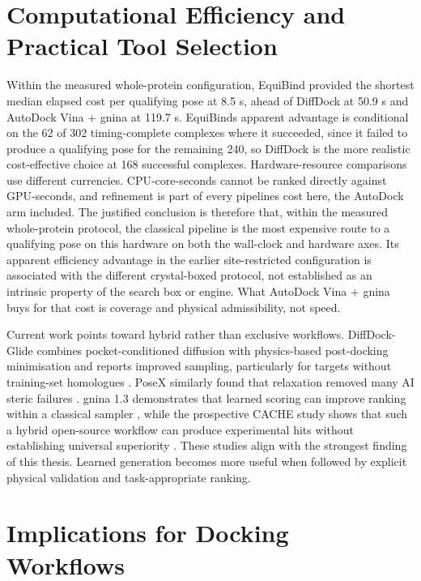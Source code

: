\hypertarget{computational-efficiency-and-practical-tool-selection}{%
\section{Computational Efficiency and Practical Tool Selection}\label{computational-efficiency-and-practical-tool-selection}}

Within the measured whole-protein configuration, EquiBind provided the shortest median elapsed cost per qualifying pose at 8.5 s, ahead of DiffDock at 50.9 s and AutoDock Vina + gnina at 119.7 s. EquiBind\textquotesingle s apparent advantage is conditional on the 62 of 302 timing-complete complexes where it succeeded, since it failed to produce a qualifying pose for the remaining 240, so DiffDock is the more realistic cost-effective choice at 168 successful complexes. Hardware-resource comparisons use different currencies. CPU-core-seconds cannot be ranked directly against GPU-seconds, and refinement is part of every pipeline\textquotesingle s cost here, the AutoDock arm included. The justified conclusion is therefore that, within the measured whole-protein protocol, the classical pipeline is the most expensive route to a qualifying pose on this hardware on both the wall-clock and hardware axes. Its apparent efficiency advantage in the earlier site-restricted configuration is associated with the different crystal-boxed protocol, not established as an intrinsic property of the search box or engine. What AutoDock Vina + gnina buys for that cost is coverage and physical admissibility, not speed.

Current work points toward hybrid rather than exclusive workflows. DiffDock-Glide combines pocket-conditioned diffusion with physics-based post-docking minimisation and reports improved sampling, particularly for targets without training-set homologues \cite{ref064}. PoseX similarly found that relaxation removed many AI steric failures \cite{ref012}. gnina 1.3 demonstrates that learned scoring can improve ranking within a classical sampler \cite{ref067}, while the prospective CACHE study shows that such a hybrid open-source workflow can produce experimental hits without establishing universal superiority \cite{ref068}. These studies align with the strongest finding of this thesis. Learned generation becomes more useful when followed by explicit physical validation and task-appropriate ranking.

\hypertarget{implications-for-docking-workflows}{%
\section{Implications for Docking Workflows}\label{implications-for-docking-workflows}}

